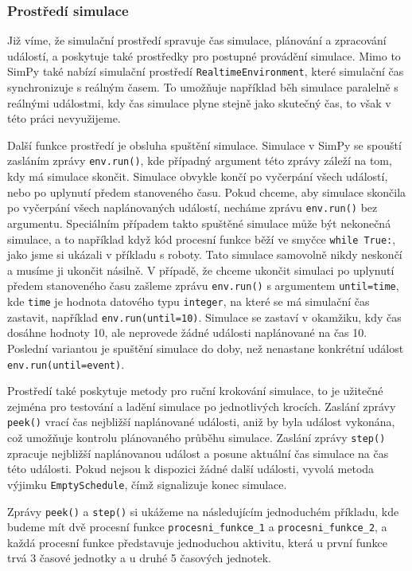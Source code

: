 \documentclass[
  program=itp,
  biblatex,
  figures=false,
  glossaries,
  index
]{kidiplom}
\begin{document}
\subsubsection{Prostředí simulace}
Již víme, že simulační prostředí spravuje čas simulace, plánování a zpracování událostí, a poskytuje také prostředky pro postupné provádění simulace. Mimo to SimPy také nabízí simulační prostředí \texttt{RealtimeEnvironment}, které simulační čas synchronizuje s reálným časem. To umožňuje například běh simulace paralelně s reálnými událostmi, kdy čas simulace plyne stejně jako skutečný čas, to však v této práci nevyužijeme.

Další funkce prostředí je obsluha spuštění simulace. Simulace v SimPy se spouští zasláním zprávy \texttt{env.run()}, kde případný argument této zprávy záleží na tom, kdy má simulace skončit. Simulace obvykle končí po vyčerpání všech událostí, nebo po uplynutí předem stanoveného času. Pokud chceme, aby simulace skončila po vyčerpání všech naplánovaných událostí, necháme zprávu \texttt{env.run()} bez argumentu. Speciálním případem takto spuštěné simulace může být nekonečná simulace, a to například když kód procesní funkce běží ve smyčce \texttt{while True:}, jako jsme si ukázali v příkladu s roboty. Tato simulace samovolně nikdy neskončí a musíme ji ukončit násilně.
V případě, že chceme ukončit simulaci po uplynutí předem stanoveného času zašleme zprávu \texttt{env.run()} s argumentem \texttt{until=time}, kde \texttt{time} je hodnota datového typu \texttt{integer}, na které se má simulační čas zastavit, například \texttt{env.run(until=10)}. Simulace se zastaví v okamžiku, kdy čas dosáhne hodnoty 10, ale neprovede žádné události naplánované na čas 10. Poslední variantou je spuštění simulace do doby, než nenastane konkrétní událost \texttt{env.run(until=event)}. 

Prostředí také poskytuje metody pro ruční krokování simulace, to je užitečné zejména pro testování a ladění simulace po jednotlivých krocích. Zaslání zprávy \texttt{peek()} vrací čas nejbližší naplánované události, aniž by byla událost vykonána, což umožňuje kontrolu plánovaného průběhu simulace. Zaslání zprávy \texttt{step()} zpracuje nejbližší naplánovanou událost a posune aktuální čas simulace na čas této události. Pokud nejsou k dispozici žádné další události, vyvolá metoda výjimku \texttt{EmptySchedule}, čímž signalizuje konec simulace. 

Zprávy \texttt{peek()} a \texttt{step()} si ukážeme na následujícím jednoduchém příkladu, kde budeme mít dvě procesní funkce \texttt{procesni\_funkce\_1} a \texttt{procesni\_funkce\_2}, a každá procesní funkce představuje jednoduchou aktivitu, která u první funkce trvá 3 časové jednotky a u druhé 5 časových jednotek.
\end{document}
